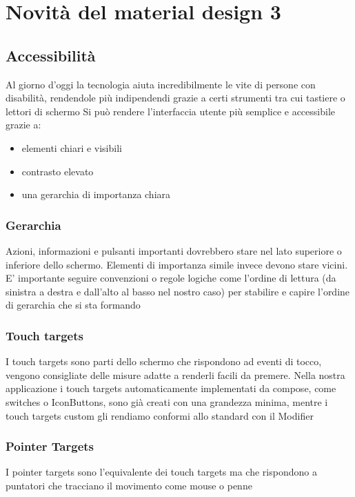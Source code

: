 \documentclass[12pt, a4paper]{report}
\begin{document}
	
	
	
\chapter{Novità del material design 3}
	\section{Accessibilità}
		Al giorno d'oggi la tecnologia aiuta incredibilmente le vite di persone con disabilità, rendendole più indipendendi grazie a certi strumenti tra cui tastiere o lettori di schermo
		Si può rendere l'interfaccia utente più semplice e accessibile grazie a:
		\begin{itemize}
			\item elementi chiari e visibili
			\item contrasto elevato
			\item una gerarchia di importanza chiara
		\end{itemize}
		\subsection{Gerarchia}
			Azioni, informazioni e pulsanti importanti dovrebbero stare nel lato superiore o inferiore dello schermo.
			Elementi di importanza simile invece devono stare vicini. E' importante seguire convenzioni o regole logiche come l'ordine di lettura (da sinistra a destra e dall'alto al basso nel nostro caso) per stabilire e capire l'ordine di gerarchia che si sta formando
		\subsection{Touch targets}
			I touch targets sono parti dello schermo che rispondono ad eventi di tocco, vengono consigliate delle misure adatte a renderli facili da premere. Nella nostra applicazione i touch targets automaticamente implementati da compose, come switches o IconButtons, sono già creati con una grandezza minima,
			mentre i touch targets custom gli rendiamo conformi allo standard con il Modifier
		\subsection{Pointer Targets}
			I pointer targets sono l'equivalente dei touch targets ma che rispondono a puntatori che tracciano il movimento come mouse o penne
\end{document}
